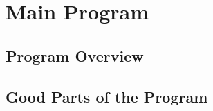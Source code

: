 \documentclass[letterpaper, 10pt,DIV=13]{scrartcl}
\numberwithin{equation}{section} %
\numberwithin{figure}{section} %
\numberwithin{table}{section} %
\begin{document}
\section{Main Program}
\subsection{Program Overview}

\subsection{Good Parts of the Program}





\end{document}
